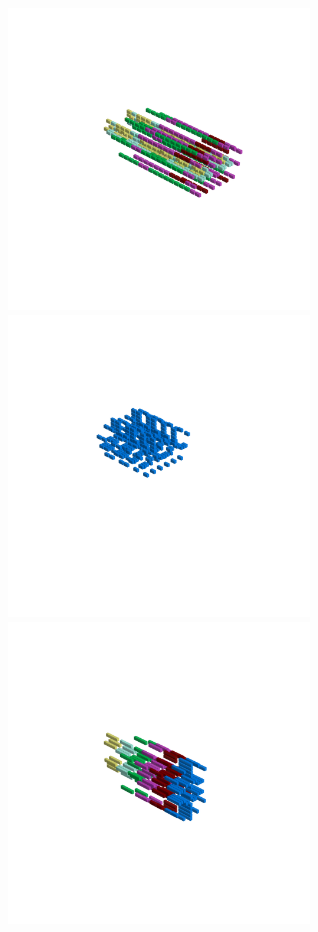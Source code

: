 \begin{minipage}[b]{0.50\linewidth}                                       
  \begin{figure}[H]
      \centering
        \vspace*{-1cm}
        \hspace*{-2cm}
        \includegraphics[width=8cm]{src/symmetries/pattern9_1-45.png}%
        \hspace*{-4cm}
        \includegraphics[width=8cm]{src/symmetries/pattern9_2-45.png}\\
        \vspace*{-5cm}
        \hspace*{-1.5cm}
        \includegraphics[width=8cm]{src/symmetries/pattern9_3-45.png}\\

\end{figure}
\end{minipage}
